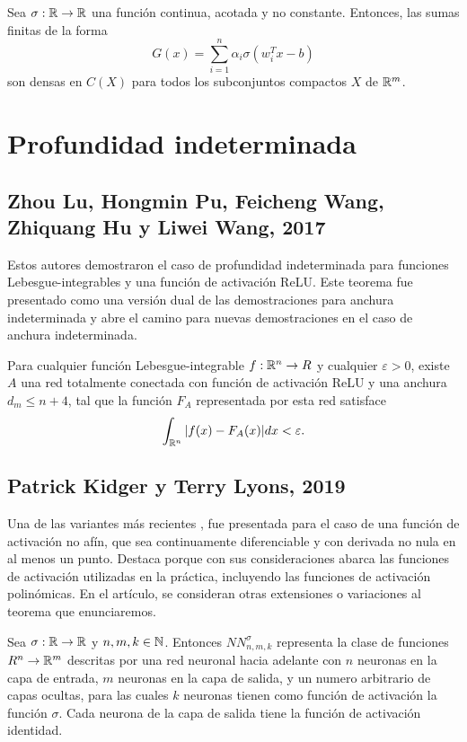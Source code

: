 \begin{teorema}
Sea $\sigma: \mathbb{R} \to \mathbb{R}$ una función continua, acotada y no constante. Entonces, las sumas finitas de la forma $$G(x)=\sum_{i=1}^n \alpha_i \sigma(w_i^Tx-b)$$ son densas en $C(X)$ para todos los subconjuntos compactos $X$ de $\mathbb{R}^m$.
\end{teorema}

\section{Profundidad indeterminada}

\subsection{Zhou Lu, Hongmin Pu, Feicheng Wang, Zhiquang Hu y Liwei Wang, 2017}
Estos autores demostraron \cite{2017arXiv170902540L} el caso de profundidad indeterminada para funciones Lebesgue-integrables y una función de activación ReLU. Este teorema fue presentado como una versión dual de las demostraciones para anchura indeterminada y abre el camino para nuevas demostraciones en el caso de anchura indeterminada.

\begin{teorema}
Para cualquier función Lebesgue-integrable $f:\mathbb{R}^n\to R$ y cualquier $\varepsilon>0$, existe $A$ una red totalmente conectada con función de activación ReLU y una anchura $d_m\leq n+4$, tal que la función $F_A$ representada por esta red satisface $$\int_{\mathbb{R}^n}|f(x)-F_A(x)|dx<\varepsilon.$$
\end{teorema}

\subsection{Patrick Kidger y Terry Lyons, 2019}
Una de las variantes más recientes \cite{2019arXiv190508539K}, fue presentada para el caso de una función de activación no afín, que sea continuamente diferenciable y con derivada no nula en al menos un punto. Destaca porque con sus consideraciones abarca las funciones de activación utilizadas en la práctica, incluyendo las funciones de activación polinómicas. En el artículo, se consideran otras extensiones o variaciones al teorema que enunciaremos.\\

\begin{definicion}
Sea $\sigma:\mathbb{R}\to\mathbb{R}$ y $n,m,k\in\mathbb{N}$. Entonces $NN_{n,m,k}^\sigma$ representa la clase de funciones $R^n\to \mathbb{R}^m$ descritas por una red neuronal hacia adelante con $n$ neuronas en la capa de entrada, $m$ neuronas en la capa de salida, y un numero arbitrario de capas ocultas, para las cuales $k$ neuronas tienen como función de activación la función $\sigma$. Cada neurona de la capa de salida tiene la función de activación identidad.
\end{definicion}

